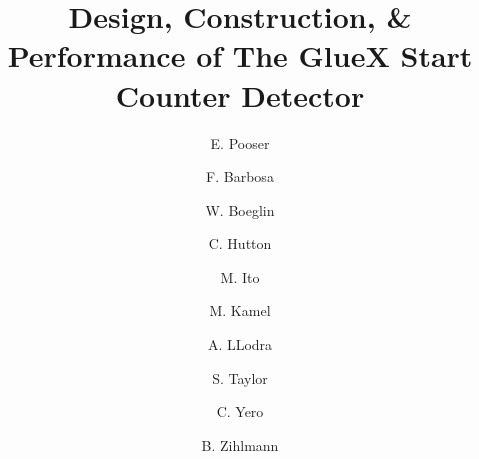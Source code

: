 \title{Design, Construction, \& Performance of The GlueX Start Counter Detector}
\author[jlab,fiu]{E. Pooser}
\author[jlab]{F. Barbosa}
\author[fiu]{W. Boeglin}
\author[jlab]{C. Hutton}
\author[jlab]{M. Ito}
\author[fiu]{M. Kamel}
\author[fiu]{A. LLodra}
\author[jlab]{S. Taylor}
\author[fiu]{C. Yero}
\author[jlab]{B. Zihlmann}
\address[jlab]{Thomas Jefferson National Accelerator Facility, Newport News, VA 23606, USA}
\address[fiu]{Florida International University, Miami, FL, 33199, USA}
